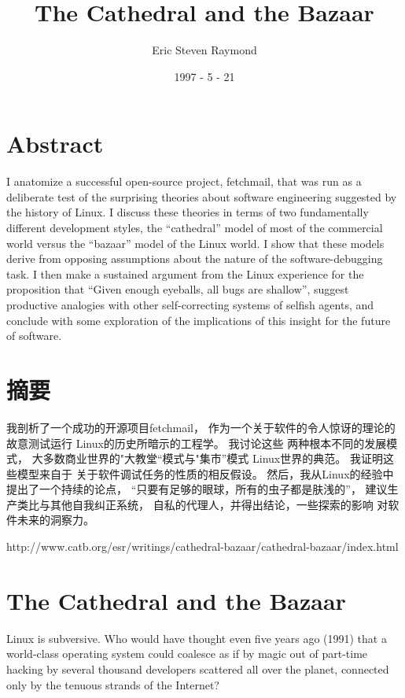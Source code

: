 \documentclass[a4paper,12pt,UTF8,twoside]{ctexbook}
\title{\heiti\zihao{0} The Cathedral and the Bazaar}
\author{Eric Steven Raymond}
\date{1997 - 5 - 21}
\begin{document}
\maketitle
\tableofcontents

\chapter{Abstract}

I anatomize a successful open-source project, fetchmail, that was run as a deliberate test of the surprising theories about software engineering suggested by the history of Linux. I discuss these theories in terms of two fundamentally different development styles, the ``cathedral'' model of most of the commercial world versus the ``bazaar'' model of the Linux world. I show that these models derive from opposing assumptions about the nature of the software-debugging task. I then make a sustained argument from the Linux experience for the proposition that ``Given enough eyeballs, all bugs are shallow'', suggest productive analogies with other self-correcting systems of selfish agents, and conclude with some exploration of the implications of this insight for the future of software.

\chapter{摘要}
我剖析了一个成功的开源项目fetchmail， 作为一个关于软件的令人惊讶的理论的故意测试运行 Linux的历史所暗示的工程学。 我讨论这些 两种根本不同的发展模式， 大多数商业世界的"大教堂“模式与"集市”模式 Linux世界的典范。 我证明这些模型来自于 关于软件调试任务的性质的相反假设。 然后，我从Linux的经验中提出了一个持续的论点， “只要有足够的眼球，所有的虫子都是肤浅的”， 建议生产类比与其他自我纠正系统， 自私的代理人，并得出结论，一些探索的影响 对软件未来的洞察力。

http://www.catb.org/esr/writings/cathedral-bazaar/cathedral-bazaar/index.html

\chapter{The Cathedral and the Bazaar}

Linux is subversive. Who would have thought even five years ago (1991) that a world-class operating system could coalesce as if by magic out of part-time hacking by several thousand developers scattered all over the planet, connected only by the tenuous strands of the Internet?
\end{document}
